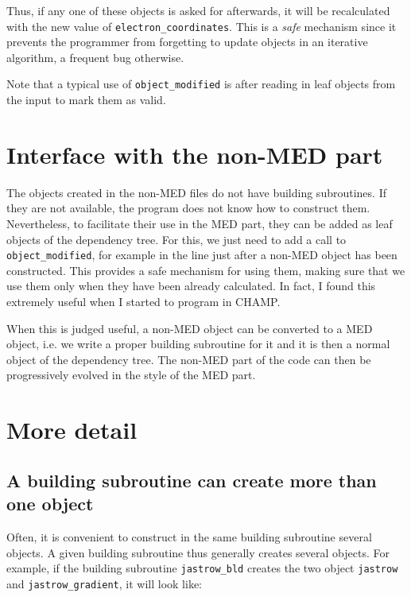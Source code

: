 \documentclass[a4paper,11pt]{article}
\begin{document}
Thus, if any one of these objects is asked for afterwards, it will be recalculated with the new value of {\tt electron_coordinates}. This is a {\it safe} mechanism since it prevents the programmer from forgetting to update objects in an iterative algorithm, a frequent bug otherwise.

Note that a typical use of {\tt object_modified} is after reading in leaf objects from the input to mark them as valid.

\section{Interface with the non-MED part}

The objects created in the non-MED files do not have building subroutines. If they are not available, the program does not know how to construct them. Nevertheless, to facilitate their use in the MED part, they can be added as leaf objects of the dependency tree. For this, we just need to add a call to {\tt object_modified}, for example in the line just after a non-MED object has been constructed. This provides a safe mechanism for using them, making sure that we use them only when they have been already calculated. In fact, I found this extremely useful when I started to program in CHAMP. 

When this is judged useful, a non-MED object can be converted to a MED object, i.e. we write a proper building subroutine for it and it is then a normal object of the dependency tree. The non-MED part of the code can then be progressively evolved in the style of the MED part.


\section{More detail}

\subsection{A building subroutine can create more than one object}

Often, it is convenient to construct in the same building subroutine several objects. A given building subroutine thus generally creates several objects. For example, if the building subroutine {\tt jastrow_bld} creates the two object {\tt jastrow} and {\tt jastrow_gradient}, it will look like:
\end{document}
